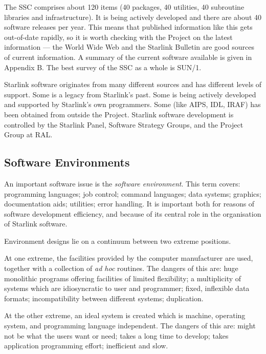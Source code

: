 \documentclass[twoside,11pt]{article}
\newenvironment{latexonly}{}{}
\newcommand{\xref}[3]{#1}
\begin{document}
The SSC comprises about 120 items (40 packages, 40 utilities, 40 subroutine
libraries and infrastructure).
It is being actively developed and there are about 40 software releases per
year.
This means that published information like this gets out-of-date rapidly,
so it is worth checking with the Project on the latest information --- the
World Wide Web and the Starlink Bulletin are good sources of current
information.
\begin{latexonly}
A summary of the current software available is given in Appendix B.
\end{latexonly}
The best survey of the SSC as a whole is \xref{SUN/1}{sun1}{}.

Starlink software originates from many different sources and has different
levels of support.
Some is a legacy from Starlink's past.
Some is being actively developed and supported by Starlink's own programmers.
Some (like AIPS, IDL, IRAF) has been obtained from outside the Project.
Starlink software development is controlled by the Starlink Panel,
Software Strategy Groups, and the Project Group at RAL.

\newpage

\subsection*{Software Environments}

An important software issue is the {\em software environment}\/.
This term covers:
programming languages;
job control;
command languages;
data systems;
graphics;
documentation aids;
utilities;
error handling.
It is important both for reasons of software development efficiency, and
because of its central role in the organisation of Starlink software.

Environment designs lie on a continuum between two extreme positions.

At one extreme, the facilities provided by the computer manufacturer are used,
together with a collection of {\em ad hoc}\/ routines.
The dangers of this are:
huge monolithic programs offering facilities of limited flexibility;
a multiplicity of systems which are idiosyncratic to user and programmer;
fixed, inflexible data formats;
incompatibility between different systems;
duplication.

At the other extreme, an ideal system is created which is machine, operating
system, and programming language independent.
The dangers of this are:
might not be what the users want or need;
takes a long time to develop;
takes application programming effort;
inefficient and slow.
\end{document}
